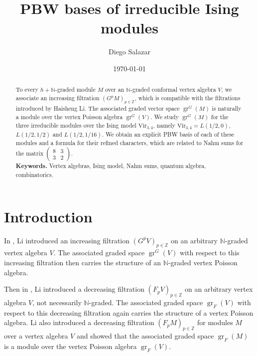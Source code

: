 \documentclass[a4paper, 12pt, reqno]{amsart}
\theoremstyle{remark}
\DeclareMathOperator{\gr}{gr}
\newcommand{\Vir}{{\mathrm{Vir}}}
\begin{document}
\setcounter{section}{-1}

\begin{abstract}
  To every $h + \mathbb{N}$-graded module $M$ over an $\mathbb{N}$-graded conformal vertex algebra $V$, we associate an increasing filtration $(G^pM)_{p \in \mathbb{Z}}$, which is compatible with the filtrations introduced by Haisheng Li.
  The associated graded vector space $\gr^G(M)$ is naturally a module over the vertex Poisson algebra $\gr^G(V)$.
  We study $\gr^G(M)$ for the three irreducible modules over the Ising model $\Vir_{3, 4}$, namely $\Vir_{3,4} = L(1/2, 0)$, $L(1/2, 1/2)$ and $L(1/2, 1/16)$.
  We obtain an explicit PBW basis of each of these modules and a formula for their refined characters, which are related to Nahm sums for the matrix $\left(\begin{smallmatrix} 8 & 3 \\ 3 & 2 \end{smallmatrix}\right)$. \\
  \smallskip
  \noindent \textbf{Keywords.} Vertex algebras, Ising model, Nahm sums, quantum algebra, combinatorics.
\end{abstract}

\title{PBW bases of irreducible Ising modules}
\author{Diego Salazar}
\address{Instituto de Matemática Pura e Aplicada, Rio de Janeiro, RJ, Brazil}
\date{\today}
\maketitle

\section{Introduction}
\label{sec:introduction}

In \cite{li_vertex_2004}, Li introduced an increasing filtration $(G^pV)_{p \in \mathbb{Z}}$ on an arbitrary $\mathbb{N}$-graded vertex algebra $V$.
The associated graded space $\gr^G(V)$ with respect to this increasing filtration then carries the structure of an $\mathbb{N}$-graded vertex Poisson algebra.

Then in \cite{li_abelianizing_2005}, Li introduced a decreasing filtration $(F_pV)_{p \in \mathbb{Z}}$ on an arbitrary vertex algebra $V$, not necessarily $\mathbb{N}$-graded.
The associated graded space $\gr_F(V)$ with respect to this decreasing filtration again carries the structure of a vertex Poisson algebra.
Li also introduced a decreasing filtration $(F_pM)_{p \in \mathbb{Z}}$ for modules $M$ over a vertex algebra $V$ and showed that the associated graded space $\gr_F(M)$ is a module over the vertex Poisson algebra $\gr_F(V)$.
\end{document}
